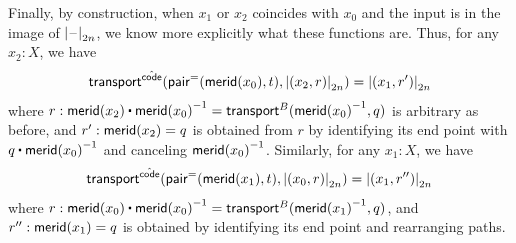 Finally, by construction, when $x_1$ or $x_2$ coincides with $x_0$ and the input is in the image of $\tproj{2n}{\blank}$, we know more explicitly what these functions are.
Thus, for any $x_2:X$, we have
\begin{equation}
  \transfib{\hat{\code}}{\pairpath(\merid(x_0),t)}{\tproj{2n}{(x_2,r)}}
  =\tproj{2n}{(x_1,r')}\label{eq:freudcompute1}
\end{equation}
where $r:\merid(x_2) \ct \opp{\merid(x_0)} = \transfib{B}{\opp{\merid(x_0)}}{q}$ is arbitrary as before, and $r':\merid(x_2)=q$ is obtained from $r$ by identifying its end point with $q \ct \opp{\merid(x_0)}$ and canceling $\opp{\merid(x_0)}$.
Similarly, for any $x_1:X$, we have
\begin{equation}
  \transfib{\hat{\code}}{\pairpath(\merid(x_1),t)}{\tproj{2n}{(x_0,r)}}
  = \tproj{2n}{(x_1,r'')}\label{eq:freudcompute2}
\end{equation}
where $r:\merid(x_0) \ct \opp{\merid(x_0)} = \transfib{B}{\opp{\merid(x_1)}}{q}$, and $r'':\merid(x_1)=q$ is obtained by identifying its end point and rearranging paths.

